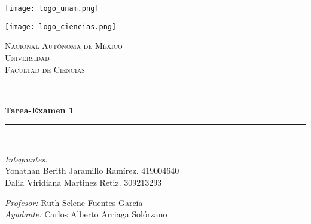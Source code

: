 
\begin{center}
    \newcommand{\HRule}{\rule{\linewidth}{0.5mm}}
    \begin{minipage}{0.48\textwidth} 
        \begin{flushleft}
            \texttt{[image: logo\_unam.png]}
        \end{flushleft}
    \end{minipage}
    \begin{minipage}{0.48\textwidth} 
        \begin{flushright}
            \texttt{[image: logo\_ciencias.png]}
        \end{flushright}
    \end{minipage}
    \vspace*{-1.5cm}						
    \textsc{\huge Nacional Autónoma de México \\ \vspace{-4px} Universidad }\\[2cm]	
    \textsc{\LARGE Facultad de Ciencias}\\[1.5cm]
    \vspace*{1cm}					
        \HRule \\[0.4cm]							
            { \huge \bfseries Tarea-Examen 1}\\[0.4cm]	
        \HRule \\[1.5cm]						    
    \begin{minipage}{0.52\textwidth}													
        \begin{flushleft} \large						\small				\vspace{-0.6cm}	
            \vspace{-0.6cm}	
            \emph{Integrantes:}\\
           Yonathan Berith Jaramillo Ramírez. 419004640 \\
           Dalia Viridiana Martinez Retiz. 309213293 \\
            \vspace*{2cm}
        \end{flushleft}																		
    \end{minipage}		
    \begin{minipage}{0.46\textwidth}		
        \vspace{-0.6cm}											
        \begin{flushright} \large						\small										
            \emph{Profesor:} 
            Ruth Selene Fuentes García \\
           \emph{Ayudante:} 
            		Carlos Alberto Arriaga Solórzano \\
            

\end{flushright}
\end{minipage}
\end{center}
